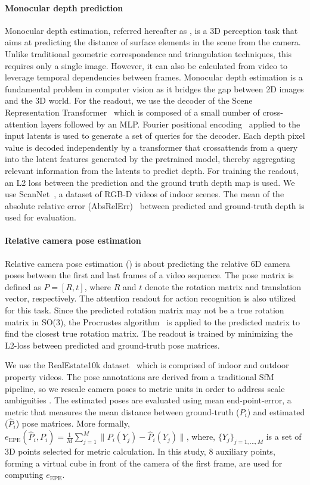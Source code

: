 \paragraph{Monocular depth prediction}
Monocular depth estimation, referred hereafter as \Tscannet, is a 3D perception task that aims at predicting the distance of surface elements in the scene from the camera. Unlike traditional geometric correspondence and triangulation techniques, this requires only a single image. However, it can also be calculated from video to leverage temporal dependencies between frames. Monocular depth estimation is a fundamental problem in computer vision as it bridges the gap between 2D images and the 3D world.
For the readout, we use the decoder of the Scene Representation Transformer~\cite{SRT} which is composed of a small number
of cross-attention layers followed by an MLP.
Fourier positional encoding~\cite{nerf} applied to the input latents is used to generate a set of queries for the decoder. Each depth pixel value is decoded independently by a transformer that crossattends from a query into the latent features generated by the pretrained model, thereby aggregating relevant information from the latents to predict depth. For training the readout, an L2 loss between the prediction and the ground truth depth map is used. 
We use ScanNet~\cite{scannet}, a dataset of RGB-D videos of indoor scenes.
The mean of the absolute relative error (AbsRelErr)~\cite{AbsRelErr} between predicted and ground-truth depth is used for evaluation.

\paragraph{Relative camera pose estimation}
Relative camera pose estimation (\Tpose) is about predicting the relative 6D camera poses between the first and last frames of a video sequence. The pose matrix is defined as $P = [R, t]$, where $R$ and $t$ denote the rotation matrix and translation vector, respectively.
The attention readout for action recognition is also utilized for this task. Since the predicted rotation matrix may not be a true rotation matrix in SO(3), the Procrustes algorithm~\cite{bregier2021deep} is applied to the predicted matrix to find the closest true rotation matrix. The readout is trained by minimizing the L2-loss between predicted and ground-truth pose matrices.

We use the RealEstate10k dataset~\cite{zhou2018stereo} which is comprised of indoor and outdoor property videos. The pose annotations are derived from a traditional SfM pipeline, so we rescale camera poses to metric units in order to address scale ambiguities \cite{watson2024controlling}.
The estimated poses are evaluated using mean end-point-error, a metric that measures the mean distance between ground-truth ($P_i$) and estimated ($\hat{P}_i$) pose matrices. More formally, $e_{\text{EPE}}(\hat{P}_i, P_i) = \frac{1}{M}\sum_{j=1}^M \| P_i(Y_j) - \hat{P}_i(Y_j) \|$, where, $\{Y_j\}_{j=1,\dots,M}$ is a set of 3D points selected for metric calculation. In this study, 8 auxiliary points, forming a virtual cube in front of the camera of the first frame, are used for computing $e_{\text{EPE}}$.


